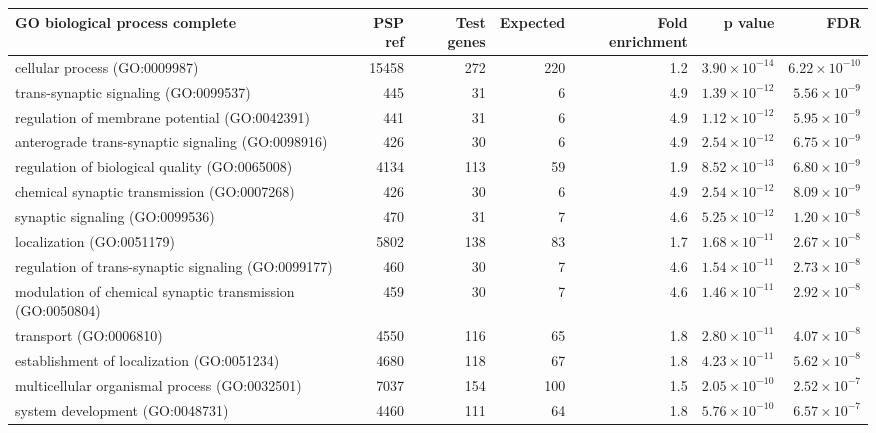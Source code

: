 \begin{table}[ht]
\centering
\begin{adjustbox}{width=\textwidth}

\begin{tabular}{lrrrrrr}
  \hline
GO biological process complete & PSP ref & Test genes & Expected & Fold enrichment & p value & FDR \\ 
  \hline
cellular process (GO:0009987) & 15458 & 272 & 220 & 1.2 & $3.90 \times 10^{-14}$ & $6.22 \times 10^{-10}$ \\ 
  trans-synaptic signaling (GO:0099537) & 445 & 31 & 6 & 4.9 & $1.39 \times 10^{-12}$ & $5.56 \times 10^{-9}$ \\ 
  regulation of membrane potential (GO:0042391) & 441 & 31 & 6 & 4.9 & $1.12 \times 10^{-12}$ & $5.95 \times 10^{-9}$ \\ 
  anterograde trans-synaptic signaling (GO:0098916) & 426 & 30 & 6 & 4.9 & $2.54 \times 10^{-12}$ & $6.75 \times 10^{-9}$ \\ 
  regulation of biological quality (GO:0065008) & 4134 & 113 & 59 & 1.9 & $8.52 \times 10^{-13}$ & $6.80 \times 10^{-9}$ \\ 
  chemical synaptic transmission (GO:0007268) & 426 & 30 & 6 & 4.9 & $2.54 \times 10^{-12}$ & $8.09 \times 10^{-9}$ \\ 
  synaptic signaling (GO:0099536) & 470 & 31 & 7 & 4.6 & $5.25 \times 10^{-12}$ & $1.20 \times 10^{-8}$ \\ 
  localization (GO:0051179) & 5802 & 138 & 83 & 1.7 & $1.68 \times 10^{-11}$ & $2.67 \times 10^{-8}$ \\ 
  regulation of trans-synaptic signaling (GO:0099177) & 460 & 30 & 7 & 4.6 & $1.54 \times 10^{-11}$ & $2.73 \times 10^{-8}$ \\ 
  modulation of chemical synaptic transmission (GO:0050804) & 459 & 30 & 7 & 4.6 & $1.46 \times 10^{-11}$ & $2.92 \times 10^{-8}$ \\ 
  transport (GO:0006810) & 4550 & 116 & 65 & 1.8 & $2.80 \times 10^{-11}$ & $4.07 \times 10^{-8}$ \\ 
  establishment of localization (GO:0051234) & 4680 & 118 & 67 & 1.8 & $4.23 \times 10^{-11}$ & $5.62 \times 10^{-8}$ \\ 
  multicellular organismal process (GO:0032501) & 7037 & 154 & 100 & 1.5 & $2.05 \times 10^{-10}$ & $2.52 \times 10^{-7}$ \\ 
  system development (GO:0048731) & 4460 & 111 & 64 & 1.8 & $5.76 \times 10^{-10}$ & $6.57 \times 10^{-7}$ \\ 

\end{tabular}
\end{adjustbox}
\end{table}
